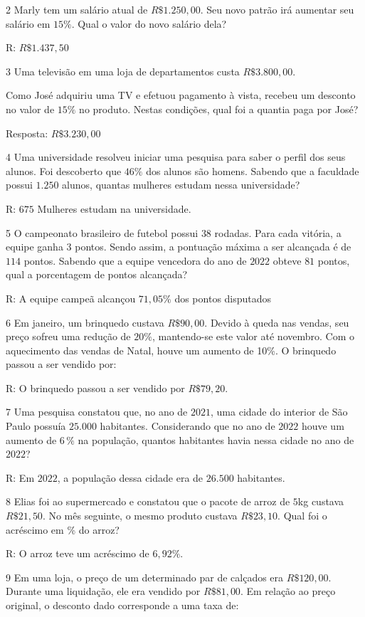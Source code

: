 \num{2}  Marly tem um salário atual de $R\$1.250,00$. Seu novo patrão irá
aumentar seu salário em $15\%$. Qual o valor do novo salário dela?

R: $R\$1.437,50$

\num{3}  Uma televisão em uma loja de departamentos custa $R\$3.800,00$.

Como José adquiriu uma TV e efetuou pagamento à vista, recebeu um
desconto no valor de $15\%$ no produto. Nestas condições, qual foi a
quantia paga por José?

Resposta: $R\$3.230,00$

\num{4}  Uma universidade resolveu iniciar uma pesquisa para saber o perfil
dos seus alunos. Foi descoberto que $46\%$ dos alunos são homens. Sabendo
que a faculdade possui $1.250$ alunos, quantas mulheres estudam nessa
universidade?

R: $675$ Mulheres estudam na universidade.

\num{5}  O campeonato brasileiro de futebol possui $38$ rodadas. Para cada
vitória, a equipe ganha $3$ pontos. Sendo assim, a pontuação máxima a ser
alcançada é de $114$ pontos. Sabendo que a equipe vencedora do ano de $2022$
obteve $81$ pontos, qual a porcentagem de pontos alcançada?

R: A equipe campeã alcançou $71,05\%$ dos pontos disputados

\num{6}  Em janeiro, um brinquedo custava $R\$90,00$. Devido à queda nas
vendas, seu preço sofreu uma redução de $20\%$, mantendo-se este valor até
novembro. Com o aquecimento das vendas de Natal, houve um aumento de
10\%. O brinquedo passou a ser vendido por:

R: O brinquedo passou a ser vendido por $R\$79,20$.

\num{7}  Uma pesquisa constatou que, no ano de $2021$, uma cidade do interior de
São Paulo possuía $25.000$ habitantes. Considerando que no ano de $2022$
houve um aumento de $6\,\%$ na população, quantos habitantes havia nessa
cidade no ano de $2022$?

R: Em $2022$, a população dessa cidade era de $26.500$ habitantes.

\num{8}  Elias foi ao supermercado e constatou que o pacote de arroz de $5$kg
custava $R\$21,50$. No mês seguinte, o mesmo produto custava $R\$23,10$.
Qual foi o acréscimo em \% do arroz?

R: O arroz teve um acréscimo de $6,92\%$.

\num{9}  Em uma loja, o preço de um determinado par de calçados era
$R\$120,00$. Durante uma liquidação, ele era vendido por $R\$81,00$. Em
relação ao preço original, o desconto dado corresponde a uma taxa de:

